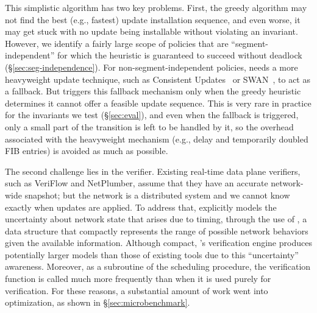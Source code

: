 This simplistic algorithm has two key problems.
First, the greedy algorithm may not find the best (e.g., fastest) 
update installation sequence, and even worse,
it may get stuck with no update being installable without violating an invariant.
However, we identify a fairly large scope of policies 
that are ``segment-independent'' for which the heuristic is guaranteed to succeed
without deadlock (\S\ref{sec:seg-independence}).
For non-segment-independent policies,
\name needs a more heavyweight update technique, 
such as Consistent Updates~\cite{Reitblatt2012} or SWAN~\cite{Hong13}, to act
as a fallback. 
But \name triggers this fallback mechanism only when the greedy heuristic
determines it cannot offer a feasible update sequence.  
This is very rare in practice for the invariants we test (\S\ref{sec:eval}),
and even when the fallback is triggered, only a small part of the transition is 
left to be handled by it, so the overhead associated with the heavyweight mechanism 
(e.g., delay and temporarily doubled FIB entries) is avoided as much as possible.

The second challenge lies in the verifier.
Existing real-time data plane verifiers, such as VeriFlow and NetPlumber,
assume that they have an accurate network-wide snapshot; 
but the network is a distributed system and we cannot know exactly 
when updates are applied.
To address that, \name explicitly models the
uncertainty about network state that arises due to timing,
through the use of , 
a data structure that compactly represents the range of possible network behaviors
given the available information. 
Although compact, \name's verification engine produces potentially larger models than 
those of existing tools due to this ``uncertainty'' awareness. 
Moreover, as a subroutine of the scheduling procedure, the verification function is called much more frequently
than when it is used purely for verification. For these reasons,
a substantial amount of work went into optimization, as shown in \S\ref{sec:microbenchmark}.

